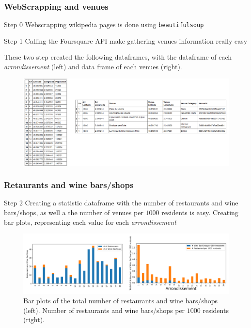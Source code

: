 \documentclass{beamer}
\begin{document}
\begin{frame}
	\frametitle{WebScrapping and venues}
	\begin{block}{Step 0}
		Webscrapping wikipedia pages is done using \texttt{beautifulsoup}		
	\end{block}
	\begin{block}{Step 1}
		Calling the Foursquare API make gathering venues information really easy
	\end{block}
	These two step created the following dataframes, with the dataframe of each \textit{arrondissement} (left) and data frame of each venues (right).
	\begin{figure}[h]
		\centering
		\includegraphics[width=0.75\linewidth,keepaspectratio]{Figures/DataFrameArrVenues}
		\label{DataFrames}
	\end{figure}
\end{frame}

\begin{frame}
	\frametitle{Retaurants and wine bars/shops}
	\begin{block}{Step 2}
		Creating a statistic dataframe with the number of restaurants and wine bars/shops, as well a the number of venues per $1000$ residents is easy. Creating bar plots, representing each value for each \textit{arrondissement}
	\end{block}
	\begin{figure}[h]
		\centering
		\includegraphics[width=\linewidth,keepaspectratio]{Figures/BarPlots}
		\caption{Bar plots of the total number of restaurants and wine bars/shops (left). Number of restaurants and wine bars/shops per $1000$ residents (right).}
		\label{BarPlots}
	\end{figure}
\end{frame}
\end{document}
